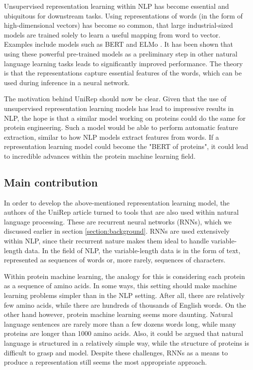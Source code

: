 \documentclass[a4paper,12pt]{article}
\begin{document}
Unsupervised representation learning within NLP has become essential and ubiquitous for downstream tasks. Using representations of words (in the form of high-dimensional vectors) has become so common, that large industrial-sized models are trained solely to learn a useful mapping from word to vector. Examples include models such as BERT and ELMo . It has been shown that using these powerful pre-trained models as a preliminary step in other natural language learning tasks leads to significantly improved performance. The theory is that the representations capture essential features of the words, which can be used during inference in a neural network.

The motivation behind UniRep should now be clear. Given that the use of unsupervised representation learning models has lead to impressive results in NLP, the hope is that a similar model working on proteins could do the same for protein engineering. Such a model would be able to perform automatic feature extraction, similar to how NLP models extract features from words. If a representation learning model could become the "BERT of proteins", it could lead to incredible advances within the protein machine learning field.

\subsection{Main contribution}
In order to develop the above-mentioned representation learning model, the authors of the UniRep article turned to tools that are also used within natural language processing. These are recurrent neural networks (RNNs), which we discussed earlier in section \ref{section:background}. RNNs are used extensively within NLP, since their recurrent nature makes them ideal to handle variable-length data. In the field of NLP, the variable-length data is in the form of text, represented as sequences of words or, more rarely, sequences of characters.

Within protein machine learning, the analogy for this is considering each protein as a sequence of amino acids. In some ways, this setting should make machine learning problems simpler than in the NLP setting. After all, there are relatively few amino acids, while there are hundreds of thousands of English words. On the other hand however, protein machine learning seems more daunting. Natural language sentences are rarely more than a few dozens words long, while many proteins are longer than 1000 amino acids. Also, it could be argued that natural language is structured in a relatively simple way, while the structure of proteins is difficult to grasp and model. Despite these challenges, RNNs as a means to produce a representation still seems the most appropriate approach.
\end{document}

